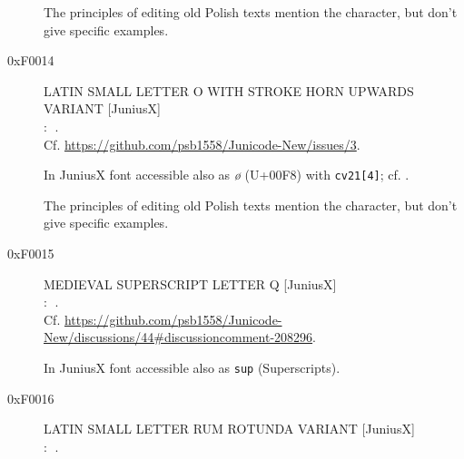 \documentclass{article}
\newcommand{\Jglyph}[1]{{\relsize{2}\J#1}}
\begin{document}
\begin{description}
 The principles of editing old Polish texts
  \autocite{Górski_Konrad__Zasady} mention the character, but don't
  give specific examples. 


\item [0xF0014] LATIN SMALL LETTER O WITH STROKE HORN UPWARDS VARIANT [JuniusX]\\:
  \Jglyph{󰀓}.\\  Cf. \url{https://github.com/psb1558/Junicode-New/issues/3}.

  In JuniusX font accessible also as \textit{ø} (U+00F8) with \texttt{cv21[4]};
  cf. \autocite[p. 9]{baker20:_opent_featur_junius_junius}.

 The principles of editing old Polish texts
  \autocite{Górski_Konrad__Zasady} mention the character, but don't
  give specific examples. 



\item [0xF0015] MEDIEVAL SUPERSCRIPT LETTER Q [JuniusX]\\:
  \Jglyph{󰀕}.\\
  Cf. \url{https://github.com/psb1558/Junicode-New/discussions/44#discussioncomment-208296}.

  In JuniusX font accessible also as \texttt{sup} (Superscripts).

\item [0xF0016] LATIN SMALL LETTER RUM ROTUNDA VARIANT [JuniusX]\\:
  \Jglyph{󰀖}.\\%


\end{description}
\end{document}
